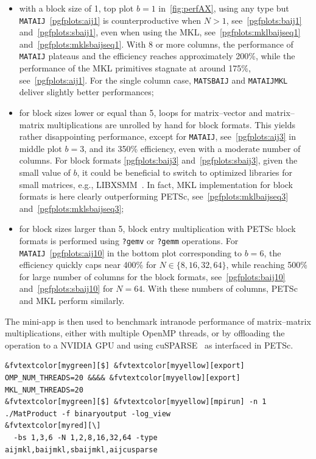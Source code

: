 \documentclass[3p,11pt]{elsarticle}
\newcommand{\pk}[1]{\texttt{#1}}
\begin{document}
\begin{itemize}
    \item with a block size of 1, top plot $b=1$ in~\cref{fig:perfAX}, using any type but \pk{MATAIJ}~\ref{pgfplots:aij1} is counterproductive when $N>1$, see~\ref{pgfplots:baij1} and~\ref{pgfplots:sbaij1}, even when using the MKL, see~\ref{pgfplots:mklbaijseq1} and~\ref{pgfplots:mklsbaijseq1}. With 8 or more columns, the performance of \pk{MATAIJ} plateaus and the efficiency reaches approximately 200\%, while the performance of the MKL primitives stagnate at around 175\%, see~\ref{pgfplots:aij1}.
For the single column case, \pk{MATSBAIJ} and \pk{MATAIJMKL} deliver slightly better performances;
    \item for block sizes lower or equal than 5, loops for matrix--vector and matrix--matrix multiplications are unrolled by hand for block formats. This yields rather disappointing performance, except for \pk{MATAIJ}, see~\ref{pgfplots:aij3} in middle plot $b=3$, and its 350\% efficiency, even with a moderate number of columns. For block formats \ref{pgfplots:baij3} and~\ref{pgfplots:sbaij3}, given the small value of $b$, it could be beneficial to switch to optimized libraries for small matrices, e.g., LIBXSMM~\cite{heinecke2016libxsmm}. In fact, MKL implementation for block formats is here clearly outperforming PETSc, see~\ref{pgfplots:mklbaijseq3} and~\ref{pgfplots:mklsbaijseq3};
    \item for block sizes larger than 5, block entry multiplication with PETSc block formats is performed using \texttt{?gemv} or \texttt{?gemm} operations. For \pk{MATAIJ}~\ref{pgfplots:aij10} in the bottom plot corresponding to $b=6$, the efficiency quickly caps near 400\% for $N\in\{8,16,32,64\}$, while reaching 500\% for large number of columns for the block formats, see~\ref{pgfplots:baij10} and~\ref{pgfplots:sbaij10} for $N=64$. With these numbers of columns, PETSc and MKL perform similarly.
\end{itemize}
The mini-app is then used to benchmark intranode performance of matrix--matrix
multiplications, either with multiple OpenMP threads, or by offloading the
operation to a NVIDIA GPU and using cuSPARSE~\cite{cusparse-web-page} as
interfaced in PETSc.
\begin{Verbatim}[fontsize=\footnotesize,frame=single,framerule=0.1mm,commandchars=&\[\]]
&fvtextcolor[mygreen][$] &fvtextcolor[myyellow][export] OMP_NUM_THREADS=20 &&&& &fvtextcolor[myyellow][export] MKL_NUM_THREADS=20
&fvtextcolor[mygreen][$] &fvtextcolor[myyellow][mpirun] -n 1 ./MatProduct -f binaryoutput -log_view                                             &fvtextcolor[myred][\]
  -bs 1,3,6 -N 1,2,8,16,32,64 -type aijmkl,baijmkl,sbaijmkl,aijcusparse
\end{Verbatim}
\end{document}

